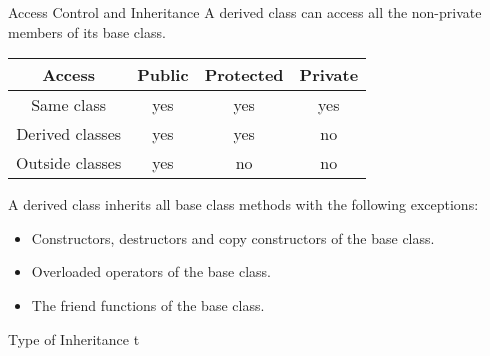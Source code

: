 \documentclass[../lecture5-objectorientation.tex]{subfiles}
\begin{document}

\begin{frame}[fragile]{Access Control and Inheritance}
    A derived class can access all the non-private members of its base class.

    \begin{table}
        \center
        \begin{tabular}{c|c|c|c}
            \toprule
            \textbf{Access} & \textbf{Public} & \textbf{Protected} & \textbf{Private} \\
            \midrule
            Same class      & yes & yes & yes \\
            Derived classes & yes & yes & no  \\
            Outside classes & yes & no  & no  \\
            \bottomrule
        \end{tabular} \newline \newline \newline
    \end{table}

    A derived class inherits all base class methods with the following exceptions:

    \begin{itemize}
        \item Constructors, destructors and copy constructors of the base class.
        \item Overloaded operators of the base class.
        \item The friend functions of the base class.
    \end{itemize}
\end{frame}


\begin{frame}[fragile]{Type of Inheritance}
t
\end{frame}

\end{document}

